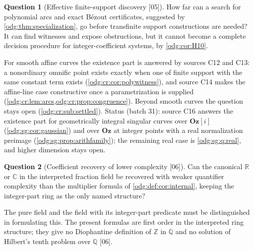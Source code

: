 \documentclass[11pt,oneside]{article}
\numberwithin{equation}{section}
\theoremstyle{definition}
\newtheorem{question}[question]{Question}
\theoremstyle{remark}
\newcommand{\Oz}{\mathbf{Oz}}
\newcommand{\Z}{\mathbb Z}
\newcommand{\Q}{\mathbb Q}
\newcommand{\R}{\mathbb R}
\newcommand{\C}{\mathbb C}
\newcommand{\src}[1]{\textup{\textsf{\small[#1]}}}
\newcommand{\Og}{\Oz[i]}
\begin{document}
\begin{question}[Effective finite-support discovery \src{05}]\label{odg:q:search}
How far can a search for polynomial arcs and exact B\'ezout certificates,
suggested by \cref{odg:thm:specialization}, go before transfinite support
constructions are needed? It can find witnesses and expose obstructions, but
it cannot become a complete decision procedure for integer-coefficient
systems, by \cref{odg:cor:H10}.
\end{question}
For smooth affine curves the existence part is answered by sources C12 and C13: a
nonordinary omnific point exists exactly when one of finite support with the same
constant term exists (\cref{odg:cr:cor:polywitness}), and source C14 makes the
affine-line case constructive once a parametrization is supplied
(\cref{odg:cr:lem:arcs,odg:cr:prop:congruence}). Beyond smooth curves the question
stays open (\cref{odg:cr:sub:settled}). Status (batch 31): source C16 answers the existence part
for geometrically integral singular curves over $\Og$
(\cref{odg:sg:cor:gaussian}) and over $\Oz$ at integer points with a real normalization
preimage (\cref{odg:sg:prop:arithfamily}); the remaining real case is \cref{odg:sg:q:real},
and higher dimension stays open.

\begin{question}[Coefficient recovery of lower complexity \src{06}]\label{odg:def:q:coeffpe}
Can the canonical $\R$ or $\C$ in the interpreted fraction field be recovered
with weaker quantifier complexity than the multiplier formula of
\cref{odg:def:cor:internal}, keeping the integer-part ring as the only named
structure?
\end{question}
The pure field and the field with its integer-part predicate must be
distinguished in formulating this. The present formulas are first order in
the interpreted ring structure; they give no Diophantine definition of $\Z$ in
$\Q$ and no solution of Hilbert's tenth problem over $\Q$ \src{06}.
\end{document}
